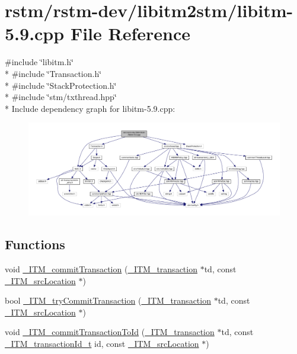 \hypertarget{libitm-5_89_8cpp}{\section{rstm/rstm-\/dev/libitm2stm/libitm-\/5.9.cpp File Reference}
\label{libitm-5_89_8cpp}
}
{\ttfamily \#include \char`\"{}libitm.\-h\char`\"{}}\\*
{\ttfamily \#include \char`\"{}Transaction.\-h\char`\"{}}\\*
{\ttfamily \#include \char`\"{}Stack\-Protection.\-h\char`\"{}}\\*
{\ttfamily \#include \char`\"{}stm/txthread.\-hpp\char`\"{}}\\*
Include dependency graph for libitm-\/5.9.cpp\-:
\nopagebreak
\begin{figure}[H]
\begin{center}
\leavevmode
\includegraphics[width=350pt]{libitm-5_89_8cpp__incl}
\end{center}
\end{figure}
\subsection*{Functions}
\begin{DoxyCompactItemize}
\item 
void \hyperlink{libitm-5_89_8cpp_acca35c0c2fd6a27267699067afb7e37a}{\-\_\-\-I\-T\-M\-\_\-commit\-Transaction} (\hyperlink{libitm_8h_a65d3a93d285fdbde408558d6b431abc8}{\-\_\-\-I\-T\-M\-\_\-transaction} $\ast$td, const \hyperlink{struct__ITM__srcLocation}{\-\_\-\-I\-T\-M\-\_\-src\-Location} $\ast$)
\item 
bool \hyperlink{libitm-5_89_8cpp_a3bd72d13a0435984f5e37794d21c89d7}{\-\_\-\-I\-T\-M\-\_\-try\-Commit\-Transaction} (\hyperlink{libitm_8h_a65d3a93d285fdbde408558d6b431abc8}{\-\_\-\-I\-T\-M\-\_\-transaction} $\ast$td, const \hyperlink{struct__ITM__srcLocation}{\-\_\-\-I\-T\-M\-\_\-src\-Location} $\ast$)
\item 
void \hyperlink{libitm-5_89_8cpp_a2c00caf7942b37b0d0a77bb0ffb0f110}{\-\_\-\-I\-T\-M\-\_\-commit\-Transaction\-To\-Id} (\hyperlink{libitm_8h_a65d3a93d285fdbde408558d6b431abc8}{\-\_\-\-I\-T\-M\-\_\-transaction} $\ast$td, const \hyperlink{libitm_8h_a560abc8cf0e1499368b0cc014ee8bd60}{\-\_\-\-I\-T\-M\-\_\-transaction\-Id\-\_\-t} id, const \hyperlink{struct__ITM__srcLocation}{\-\_\-\-I\-T\-M\-\_\-src\-Location} $\ast$)
\end{DoxyCompactItemize}


